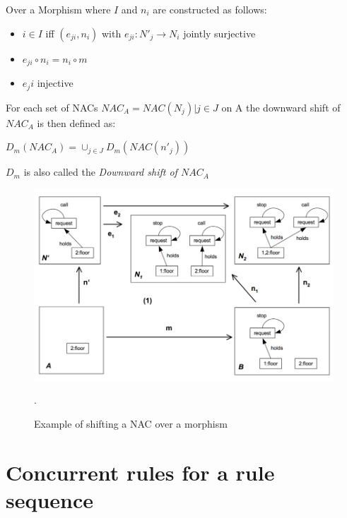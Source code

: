 \documentclass[xcolor=dvipsnames,pdf,10pt]{beamer}
\begin{document}
\begin{frame}[allowframebreaks]{Over a Morphism}
where $I$ and $n_i$ are constructed as follows:

\begin{itemize}
\item $i \in I$ iff $(e_{ji}, n_i)$ with $e_{ji} : N'_j \rightarrow N_i$ jointly surjective 
\item $e_{ji} \circ n_i = n_i \circ m$
\item $e_ji$ injective
\end{itemize}

For each set of NACs $NAC_A = {NAC(N_j)| j \in J}$ on A the downward shift of $NAC_A$ is then defined as: 

\begin{center}
$D_m(NAC_A) = \cup_{j \in J}D_m(NAC(n'_j))$
\end{center}

$D_m$ is also called the \emph{Downward shift of $NAC_A$}



\begin{figure}[htbp]
\centering
\includegraphics[width=1\textwidth]{fig/nac-shifted-over-morphism-elevator.png}
\caption{\label{fig:nac-shifted-over-morphism-elevator} Example of shifting a NAC over a morphism}.
\end{figure}

\end{frame}

\section{Concurrent rules for a rule sequence}
\end{document}
